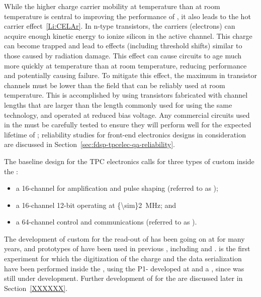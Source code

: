 While the higher charge carrier mobility at  temperature than at room
temperature is central to improving the performance of , it also leads
to the hot carrier effect~\ref{Li:CELAr}. In n-type  transistors, the carriers (electrons)
can acquire enough kinetic energy to ionize silicon in the active channel. This
charge can become trapped and lead to effects (including threshold shifts)
similar to those caused by radiation damage. This effect can cause 
circuits to age much more quickly at  temperature than at room temperature,
reducing performance and potentially causing failure. To mitigate this effect,
the maximum \efield in transistor channels must be lower than the field that
can be reliably used at room temperature. This is accomplished by using transistors
fabricated with channel lengths that are larger than the length commonly used
for  using the same technology, and operated at reduced bias voltage. 
Any commercial circuits used in the  must be carefully tested to ensure 
they will perform well for the expected \dunelifetime lifetime of ; 
reliability studies for front-end electronics designs in consideration are 
discussed in Section~\ref{sec:fdsp-tpcelec-qa-reliability}.

The baseline design for the  TPC electronics calls for three 
types of custom  inside  the :
\begin{itemize}
\item{a \num{16}-channel   for amplification 
and pulse shaping (referred to as );}
\item{a \num{16}-channel \num{12}-bit   
operating at \SI{{\sim}2}{MHz}; and}
\item{a \num{64}-channel control and communications  
(referred to as ).}
\end{itemize}

The development of custom  for the read-out of 
 has been going on at  for many years, and prototypes
of  have been used in previous  , 
including  and .  is the first
experiment for which the digitization of the charge and the data serialization
have been performed inside the \lar, using the P1-  
developed at  and a , since  was
still under development. Further development of  for the
  are discussed later in Section~\ref{XXXXXX}.

